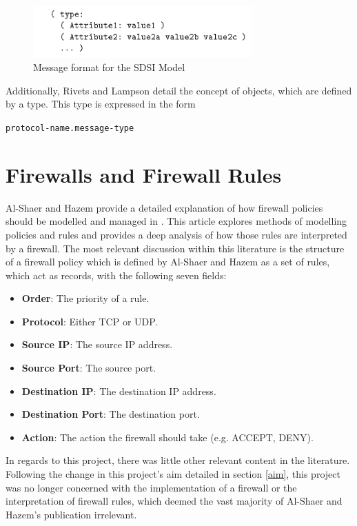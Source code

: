 \documentclass[a4paper, 11pt]{report}
\begin{document}
\begin{figure}[H]
\centering
\includegraphics[height=2cm,keepaspectratio]{distmsg}
\caption{Message format for the SDSI Model \cite{sdsi}} 
\label{fig:sdsimessage}
\end{figure}

Additionally, Rivets and Lampson detail the concept of objects, which are defined by a type. This type is expressed in the form 

\begin{center} 
\texttt{protocol-name.message-type}
\end{center}

\section{Firewalls and Firewall Rules}
Al-Shaer and Hazem provide a detailed explanation of how firewall policies should be modelled and managed in  \cite{firewall}. This article explores methods of modelling policies and rules and provides a deep analysis of how those rules are interpreted by a firewall. The most relevant discussion within this literature is the structure of a firewall policy which is defined by Al-Shaer and Hazem as a set of rules, which act as records, with the following seven fields:

\begin{itemize}
    \item \textbf{Order}: The priority of a rule.
    \item \textbf{Protocol}: Either \acrfull{TCP} or \acrfull{UDP}.
    \item \textbf{Source IP}: The source IP address.
    \item \textbf{Source Port}: The source port.
    \item \textbf{Destination IP}: The destination IP address.
    \item \textbf{Destination Port}: The destination port.
    \item \textbf{Action}: The action the firewall should take (e.g. ACCEPT, DENY).
\end{itemize}

In regards to this project, there was little other relevant content in the literature. Following the change in this project's aim detailed in section \ref{aim}, this project was no longer concerned with the implementation of a firewall or the interpretation of firewall rules, which deemed the vast majority of Al-Shaer and Hazem's publication irrelevant.
\end{document}
